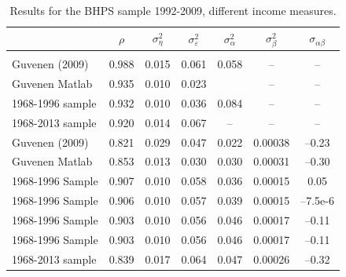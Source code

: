 \begin{table}%
\begin{tabular}{l|cccccc}
                    &$\rho$ & $\sigma^2_{\eta}$&$\sigma^2_{\varepsilon}$&$\sigma^2_{\alpha}$&$\sigma^2_{\beta}$&$\sigma_{\alpha \beta}$\\
\hline
\hline \\
Guvenen (2009)   & 0.988 &  0.015           &   0.061                &       0.058       &        --        &        --             \\
Guvenen Matlab   & 0.935 &  0.010           &   0.023                &                   &        --        &        --             \\
1968-1996 sample & 0.932 &  0.010           &   0.036                &       0.084       &        --        &        --             \\
1968-2013 sample & 0.920 &  0.014           &   0.067                &       --          &        --        &        --             \\
\hline
Guvenen (2009)   & 0.821 &  0.029           &   0.047                &   0.022           &     0.00038      &     --0.23            \\
Guvenen Matlab   & 0.853 &  0.013           &   0.030                &   0.030           &     0.00031      &     --0.30            \\
1968-1996 Sample & 0.907 &  0.010           &   0.058                &   0.036           &     0.00015      &       0.05            \\
1968-1996 Sample & 0.906 &  0.010           &   0.057                &   0.039           &     0.00015      &     --7.5e-6          \\
1968-1996 Sample & 0.903 &  0.010           &   0.056                &   0.046           &     0.00017      &     --0.11            \\
1968-1996 Sample & 0.903 &  0.010           &   0.056                &   0.046           &     0.00017      &     --0.11            \\
1968-2013 sample & 0.839 &  0.017           &   0.064                &   0.047           &     0.00026      &     --0.32            \\
\hline
\end{tabular}
\caption{Results for the BHPS sample 1992-2009, different income measures.}
\label{BHPS_results}
\end{table}

